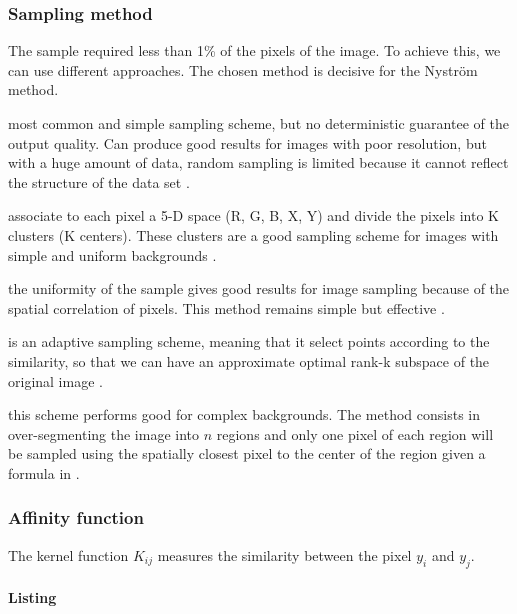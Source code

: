 \subsubsection{Sampling method}
The sample required less than 1\% of the pixels of the image. To achieve this, we can use different approaches. The chosen method is decisive for the Nystr\"om method.
\begin{description}[align=left]
 \item [Random sampling (RS)] most common and simple sampling scheme, but no deterministic guarantee of the output quality. Can produce good results for images with poor resolution, but with a huge amount of data, random sampling is limited because it cannot reflect the structure of the data set \cite{zhan_improved_2017}.
 \item [K-means sampling (KS)] associate to each pixel a 5-D space (R, G, B, X, Y) and divide the pixels into K clusters (K centers). These clusters are a good sampling scheme for images with simple and uniform backgrounds \cite{kao_sampling_2012} \cite{zhang_improved_2008}.
 \item [Uniform spatially sampling] the uniformity of the sample gives good results for image sampling because of the spatial correlation of pixels. This method remains simple but effective \cite{glide_2014}.
 \item [Incremental sampling (INS)] is an adaptive sampling scheme, meaning that it select points according to the similarity, so that we can have an approximate optimal rank-k subspace of the original image \cite{zhan_improved_2017}.
 \item [Mean-shift segmentation-based sampling] this scheme performs good for complex backgrounds. The method consists in over-segmenting the image into \(n\) regions and only one pixel of each region will be sampled using the spatially closest pixel to the center of the region given a formula in \cite{kao_sampling_2012}.
\end{description}

\subsubsection{Affinity function}
The kernel function \(K_{ij}\) measures the similarity between the pixel \(y_i\) and \(y_j\).

\paragraph{Listing}

